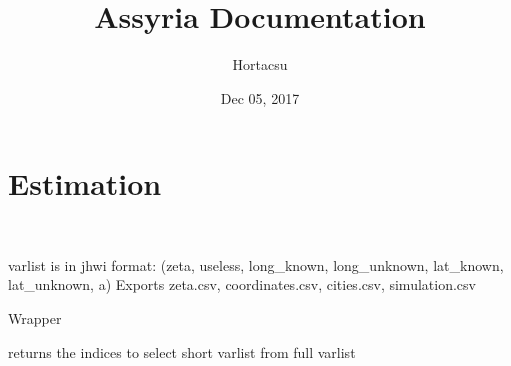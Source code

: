 \documentclass[letterpaper,10pt,english]{sphinxmanual}
\title{Assyria Documentation}
\date{Dec 05, 2017}
\author{Hortacsu}
\begin{document}
\maketitle
\sphinxtableofcontents
{}\label{\detokenize{index::doc}}



\chapter{Estimation}
\label{\detokenize{index:welcome-to-assyria-s-documentation}}\label{\detokenize{index:estimation}}

\begin{fulllineitems}
\label{\detokenize{index:estimate.Estimate}}~

\begin{fulllineitems}
\label{\detokenize{index:estimate.Estimate.export_results}}
varlist is in jhwi format:
(zeta, useless, long\_known, long\_unknown, lat\_known, lat\_unknown, a)
Exports zeta.csv, coordinates.csv, cities.csv, simulation.csv

\end{fulllineitems}


\begin{fulllineitems}
\label{\detokenize{index:estimate.Estimate.fetch_dist}}
Wrapper

\end{fulllineitems}


\begin{fulllineitems}
\label{\detokenize{index:estimate.Estimate.full_to_short_i}}
returns the indices to select short varlist from full varlist

\end{fulllineitems}



\end{fulllineitems}
\end{document}
